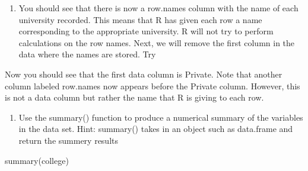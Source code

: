 \documentclass[
]{article}
\newenvironment{Shaded}{\begin{snugshade}}{\end{snugshade}}
\newcommand{\CommentTok}[1]{\textcolor[rgb]{0.56,0.35,0.01}{\textit{#1}}}
\newcommand{\DecValTok}[1]{\textcolor[rgb]{0.00,0.00,0.81}{#1}}
\newcommand{\FunctionTok}[1]{\textcolor[rgb]{0.00,0.00,0.00}{#1}}
\newcommand{\NormalTok}[1]{#1}
\newcommand{\OtherTok}[1]{\textcolor[rgb]{0.56,0.35,0.01}{#1}}
\newcommand{\SpecialCharTok}[1]{\textcolor[rgb]{0.00,0.00,0.00}{#1}}
\providecommand{\tightlist}{%
  \setlength{\itemsep}{0pt}\setlength{\parskip}{0pt}}
\begin{document}
\begin{enumerate}
\def\labelenumi{\alph{enumi}.}
\setcounter{enumi}{2}
\tightlist
\item
  You should see that there is now a row.names column with the name of
  each university recorded. This means that R has given each row a name
  corresponding to the appropriate university. R will not try to perform
  calculations on the row names. Next, we will remove the first column
  in the data where the names are stored. Try
\end{enumerate}

\begin{Shaded}
\end{Shaded}

Now you should see that the first data column is Private. Note that
another column labeled row.names now appears before the Private column.
However, this is not a data column but rather the name that R is giving
to each row.

\begin{enumerate}
\def\labelenumi{\roman{enumi}.}
\tightlist
\item
  Use the summary() function to produce a numerical summary of the
  variables in the data set. Hint: summary() takes in an object such as
  data.frame and return the summery results
\end{enumerate}

\begin{Shaded}
\begin{Highlighting}[]
\FunctionTok{summary}\NormalTok{(college)}
\end{Highlighting}
\end{Shaded}
\end{document}
